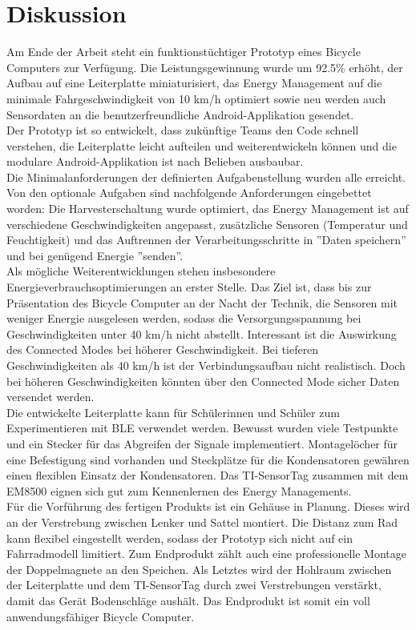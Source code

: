 \chapter{Diskussion}

Am Ende der Arbeit steht ein funktionstüchtiger Prototyp eines Bicycle Computers zur Verfügung. Die Leistungsgewinnung wurde um 92.5\thinspace\% erhöht, der Aufbau auf eine Leiterplatte miniaturisiert, das Energy Management auf die minimale Fahrgeschwindigkeit von 10 km/h optimiert sowie neu werden auch Sensordaten an die benutzerfreundliche Android-Applikation gesendet.\\

Der Prototyp ist so entwickelt, dass zukünftige Teams den Code schnell verstehen, die Leiterplatte leicht aufteilen und weiterentwickeln können und die modulare Android-Applikation ist nach Belieben ausbaubar.\\

Die Minimalanforderungen der definierten Aufgabenstellung wurden alle erreicht. Von den optionale Aufgaben sind nachfolgende Anforderungen eingebettet worden: Die Harvesterschaltung wurde optimiert, das Energy Management ist auf verschiedene Geschwindigkeiten angepasst, zusätzliche Sensoren (Temperatur und Feuchtigkeit) und das Auftrennen der Verarbeitungsschritte in ''Daten speichern'' und bei genügend Energie ''senden''.\\

Als mögliche Weiterentwicklungen stehen insbesondere Energieverbrauchsoptimierungen an erster Stelle. Das Ziel ist, dass bis zur Präsentation des Bicycle Computer an der Nacht der Technik, die Sensoren mit weniger Energie ausgelesen werden, sodass die Versorgungsspannung bei Geschwindigkeiten unter 40 km/h nicht abstellt. Interessant ist die Auswirkung des Connected Modes bei höherer Geschwindigkeit. Bei tieferen Geschwindigkeiten als 40 km/h ist der Verbindungsaufbau nicht realistisch. Doch bei höheren Geschwindigkeiten könnten über den Connected Mode sicher Daten versendet werden.\\

Die entwickelte Leiterplatte kann für Schülerinnen und Schüler zum Experimentieren mit BLE verwendet werden. Bewusst wurden viele Testpunkte und ein Stecker für das Abgreifen der Signale implementiert. Montagelöcher für eine Befestigung sind vorhanden und Steckplätze für die Kondensatoren gewähren einen flexiblen Einsatz der Kondensatoren. Das TI-SensorTag zusammen mit dem EM8500 eignen sich gut zum Kennenlernen des Energy Managements.\\
\newpage
Für die Vorführung des fertigen Produkts ist ein Gehäuse in Planung. Dieses wird an der Verstrebung zwischen Lenker und Sattel montiert. Die Distanz zum Rad kann flexibel eingestellt werden, sodass der Prototyp sich nicht auf ein Fahrradmodell limitiert. Zum Endprodukt zählt auch eine professionelle Montage der Doppelmagnete an den Speichen. Als Letztes wird der Hohlraum zwischen der Leiterplatte und dem TI-SensorTag durch zwei Verstrebungen verstärkt, damit das Gerät Bodenschläge aushält. Das Endprodukt ist somit ein voll anwendungsfähiger Bicycle Computer.\\

